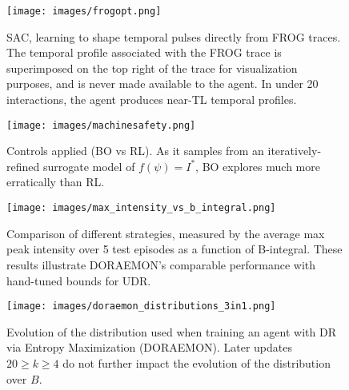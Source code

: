 \begin{figure}
    \centering
    \begin{minipage}{0.65\textwidth}
        \centering
        \texttt{[image: images/frogopt.png]}
        \caption{SAC, learning to shape temporal pulses directly from FROG traces. The temporal profile associated with the FROG trace is superimposed on the top right of the trace for visualization purposes, and is never made available to the agent. In under 20 interactions, the agent produces near-TL temporal profiles.}
        \label{fig:frog_opt}
    \end{minipage}
    \hfill
    \begin{minipage}{0.30\textwidth}
        \centering
        \texttt{[image: images/machinesafety.png]}
        \caption{Controls applied (BO vs RL). As it samples from an iteratively-refined surrogate model of \( f(\psi)=I^*\), BO explores much more erratically than RL.}
        \label{fig:bayes_vs_rl}
    \end{minipage}
\end{figure}

\begin{figure}
    \centering
    \begin{minipage}{0.48\linewidth}
        \centering
        \texttt{[image: images/max\_intensity\_vs\_b\_integral.png]}
        \caption{Comparison of different strategies, measured by the average max peak intensity over 5 test episodes as a function of B-integral. These results illustrate DORAEMON's comparable performance with hand-tuned bounds for UDR.}
        \label{fig:max_intensity_vs_b_integral}
    \end{minipage}
    \hfill
    \begin{minipage}{0.48\linewidth}
        \centering
        \texttt{[image: images/doraemon\_distributions\_3in1.png]}
        \caption{Evolution of the distribution used when training an agent with DR via Entropy Maximization (DORAEMON). Later updates $20 \geq k \geq 4$ do not further impact the evolution of the distribution over $B$.
        }
        \label{fig:DORAEMON_distrs_over_training}
    \end{minipage}
\end{figure}

